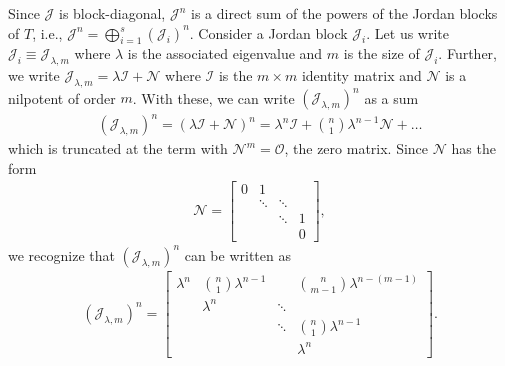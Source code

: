 \documentclass[11pt]{article}
\begin{document}
Since $\mathcal{J}$ is block-diagonal, $\mathcal{J}^n$ is a direct sum of the powers of the Jordan blocks of $T$, i.e., $\mathcal{J}^n = \bigoplus^s_{i=1} (\mathcal{J}_i)^n$. Consider a Jordan block $\mathcal{J}_i$. Let us write $\mathcal{J}_i \equiv \mathcal{J}_{\lambda,m}$ where $\lambda$ is the associated eigenvalue and $m$ is the size of $\mathcal{J}_i$. Further, we write $\mathcal{J}_{\lambda,m} = \lambda\mathcal{I} + \mathcal{N}$ where $\mathcal{I}$ is the $m\times m$ identity matrix and $\mathcal{N}$ is a nilpotent of order $m$. With these, we can write $(\mathcal{J}_{\lambda,m})^n$ as a sum
\begin{align*}
(\mathcal{J}_{\lambda,m} )^n = (\lambda \mathcal{I} + \mathcal{N})^n = \lambda^n \mathcal{I} + {n \choose 1}\lambda^{n-1}\mathcal{N} + \dots
\end{align*}  
which is truncated at the term with $\mathcal{N}^m = \mathcal{O}$, the zero matrix. Since $\mathcal{N}$ has the form 
\begin{align*}
\mathcal{N} = \begin{bmatrix}
0 & 1 &&\\
& \ddots & \ddots & \\
&&\ddots&1\\
&&&0
\end{bmatrix},
\end{align*}
we recognize that $(\mathcal{J}_{\lambda,m} )^n$ can be written as
\begin{align*}
(\mathcal{J}_{\lambda,m})^n = \begin{bmatrix}
\lambda^n & {n\choose 1}\lambda^{n-1} & & {n\choose {m-1}}\lambda^{n-(m-1)} \\
& \lambda^n & \ddots &\\
&& \ddots & {n\choose 1}\lambda^{n-1}\\
&&&\lambda^{n}
\end{bmatrix}.
\end{align*}
\end{document}
